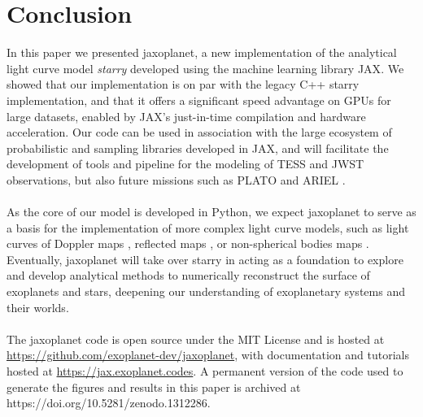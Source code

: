 \documentclass[modern]{aastex631}
\begin{document}
\section{Conclusion}
In this paper we presented \textsf{jaxoplanet}, a new implementation of the analytical light curve model \textit{starry} developed using the machine learning library \textsf{JAX}. We showed that our implementation is on par with the legacy C++ \textsf{starry} implementation, and that it offers a significant speed advantage on GPUs for large datasets, enabled by \textsf{JAX}'s just-in-time compilation and hardware acceleration. Our code can be used in association with the large ecosystem of probabilistic and sampling libraries developed in \textsf{JAX}, and will facilitate the development of tools and pipeline for the modeling of TESS and JWST observations, but also future missions such as PLATO \citep{Rauer2014} and ARIEL \citep{Tinetti2018}.\\\\
As the core of our model is developed in Python, we expect \textsf{jaxoplanet} to serve as a basis for the implementation of more complex light curve models, such as light curves of Doppler maps \citep{Luger2021c}, reflected maps \citep{Luger2022}, or non-spherical bodies maps \citep{Dholakia2024}. Eventually, \textsf{jaxoplanet} will take over \textsf{starry} in acting as a foundation to explore and develop analytical methods to numerically reconstruct the surface of exoplanets and stars, deepening our understanding of exoplanetary systems and their worlds.\\\\
The \textsf{jaxoplanet} code is open source under the MIT License and is hosted at \href{https://github.com/exoplanet-dev/jaxoplanet/}{https://github.com/exoplanet-dev/jaxoplanet}, with documentation and tutorials hosted at \href{https://jax.exoplanet.codes}{https://jax.exoplanet.codes}. A permanent version of the code used to generate the figures and results in this paper is archived at https://doi.org/10.5281/zenodo.1312286.




\appendix
\end{document}
